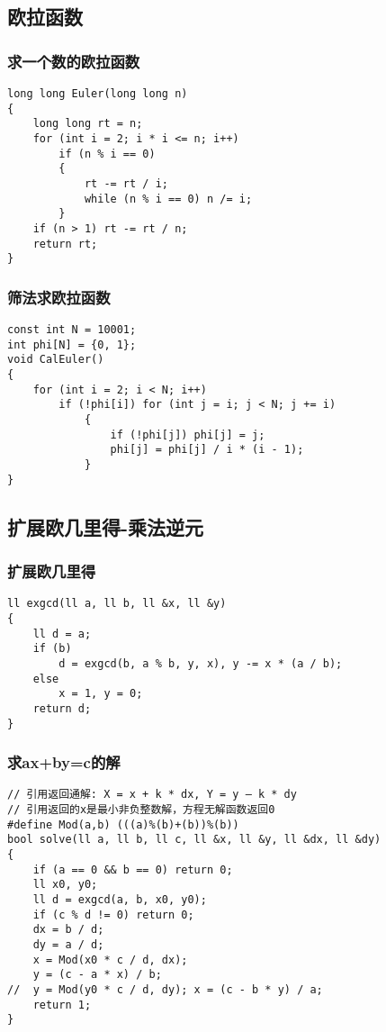 \documentclass[a4]{article}
\begin{document}
\subsection{欧拉函数}
\subsubsection{求一个数的欧拉函数}
\begin{lstlisting}
long long Euler(long long n)
{
    long long rt = n;
    for (int i = 2; i * i <= n; i++)
        if (n % i == 0)
        {
            rt -= rt / i;
            while (n % i == 0) n /= i;
        }
    if (n > 1) rt -= rt / n;
    return rt;
}
\end{lstlisting}
\subsubsection{筛法求欧拉函数}
\begin{lstlisting}
const int N = 10001;
int phi[N] = {0, 1};
void CalEuler()
{
    for (int i = 2; i < N; i++)
        if (!phi[i]) for (int j = i; j < N; j += i)
            {
                if (!phi[j]) phi[j] = j;
                phi[j] = phi[j] / i * (i - 1);
            }
}
\end{lstlisting}
\subsection{扩展欧几里得-乘法逆元}
\subsubsection{扩展欧几里得}
\begin{lstlisting}
ll exgcd(ll a, ll b, ll &x, ll &y)
{
    ll d = a;
    if (b)
        d = exgcd(b, a % b, y, x), y -= x * (a / b);
    else
        x = 1, y = 0;
    return d;
}
\end{lstlisting}
\subsubsection{求ax+by=c的解}
\begin{lstlisting}
// 引用返回通解: X = x + k * dx, Y = y – k * dy
// 引用返回的x是最小非负整数解，方程无解函数返回0
#define Mod(a,b) (((a)%(b)+(b))%(b))
bool solve(ll a, ll b, ll c, ll &x, ll &y, ll &dx, ll &dy)
{
    if (a == 0 && b == 0) return 0;
    ll x0, y0;
    ll d = exgcd(a, b, x0, y0);
    if (c % d != 0) return 0;
    dx = b / d;
    dy = a / d;
    x = Mod(x0 * c / d, dx);
    y = (c - a * x) / b;
//  y = Mod(y0 * c / d, dy); x = (c - b * y) / a;
    return 1;
}
\end{lstlisting}
\end{document}
